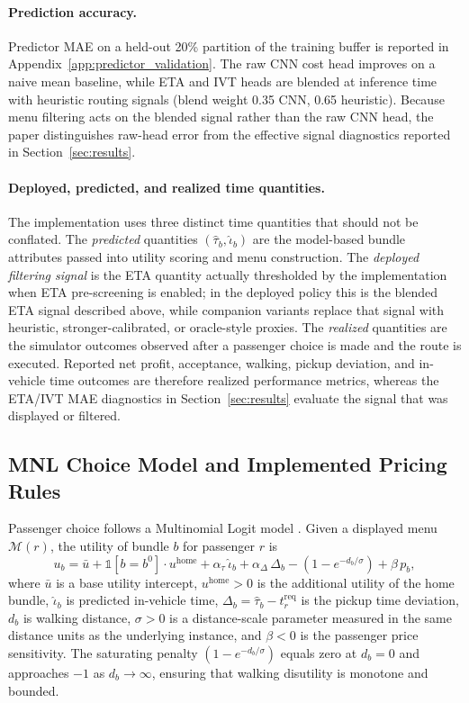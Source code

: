 \paragraph{Prediction accuracy.} Predictor MAE on a held-out 20\% partition of the training buffer is reported in Appendix~\ref{app:predictor_validation}. The raw CNN cost head improves on a naive mean baseline, while ETA and IVT heads are blended at inference time with heuristic routing signals (blend weight 0.35 CNN, 0.65 heuristic). Because menu filtering acts on the blended signal rather than the raw CNN head, the paper distinguishes raw-head error from the effective signal diagnostics reported in Section~\ref{sec:results}.

\paragraph{Deployed, predicted, and realized time quantities.} The implementation uses three distinct time quantities that should not be conflated. The \emph{predicted} quantities $(\hat{\tau}_b, \hat{\iota}_b)$ are the model-based bundle attributes passed into utility scoring and menu construction. The \emph{deployed filtering signal} is the ETA quantity actually thresholded by the implementation when ETA pre-screening is enabled; in the deployed policy this is the blended ETA signal described above, while companion variants replace that signal with heuristic, stronger-calibrated, or oracle-style proxies. The \emph{realized} quantities are the simulator outcomes observed after a passenger choice is made and the route is executed. Reported net profit, acceptance, walking, pickup deviation, and in-vehicle time outcomes are therefore realized performance metrics, whereas the ETA/IVT MAE diagnostics in Section~\ref{sec:results} evaluate the signal that was displayed or filtered.

\subsection{MNL Choice Model and Implemented Pricing Rules}
\label{sec:mnl}

Passenger choice follows a Multinomial Logit model \citep{ben1985discrete,mcfadden1974conditional}. Given a displayed menu $\mathcal{M}(r)$, the utility of bundle $b$ for passenger $r$ is
\begin{equation}
  u_b = \bar{u} + \mathbb{1}[b = b^0]\cdot u^{\text{home}}
        + \alpha_{\tau}\,\hat{\iota}_b
        + \alpha_{\Delta}\,\Delta_b
        - (1 - e^{-d_b / \sigma})
        + \beta\, p_b,
  \label{eq:utility}
\end{equation}
where $\bar{u}$ is a base utility intercept, $u^{\text{home}} > 0$ is the additional utility of the home bundle, $\hat{\iota}_b$ is predicted in-vehicle time, $\Delta_b = \hat{\tau}_b - t_r^{\text{req}}$ is the pickup time deviation, $d_b$ is walking distance, $\sigma > 0$ is a distance-scale parameter measured in the same distance units as the underlying instance, and $\beta < 0$ is the passenger price sensitivity. The saturating penalty $(1 - e^{-d_b/\sigma})$ equals zero at $d_b = 0$ and approaches $-1$ as $d_b \to \infty$, ensuring that walking disutility is monotone and bounded.

